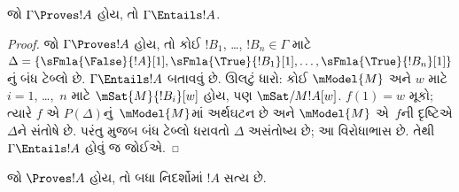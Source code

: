 \begin{cor}
જો $\Gamma \Proves !A$ હોય, તો
$\Gamma \Entails !A$.
\end{cor}

\begin{proof}
  જો $\Gamma \Proves !A$ હોય, તો કોઈ
  $!B_1$, \dots, $!B_n \in \Gamma$ માટે
  $\Delta = \{\sFmla{\False}{!A}[1],
  \sFmla{\True}{!B_1}[1], \dots,
  \sFmla{\True}{!B_n}[1]\}$નું બંધ
  ટેબ્લો છે. $\Gamma \Entails !A$
  બતાવવું છે. ઊલટું ધારો: કોઈ
  $\mModel{M}$ અને $w$ માટે $i=1$,
  \dots,~$n$ માટે $\mSat{M}{!B_i}[w]$
  હોય, પણ $\mSat/{M}{!A}[w]$.
  $f(1) = w$ મૂકો; ત્યારે $f$ એ
  $P(\Delta)$નું~$\mModel{M}$માં અર્થઘટન
  છે અને $\mModel{M}$ એ~$f$ની દૃષ્ટિએ
  $\Delta$ને સંતોષે છે. પરંતુ
   મુજબ બંધ
  ટેબ્લો ધરાવતો $\Delta$ અસંતોષ્ય છે;
  આ વિરોધાભાસ છે. તેથી
  $\Gamma \Entails !A$ હોવું જ જોઈએ.
\end{proof}

\begin{cor}
જો $\Proves !A$ હોય, તો બધા નિદર્શોમાં
$!A$ સત્ય છે.
\end{cor}
\endgroup


\OLEndChapterHook
\endgroup


\OLEndPartHook
